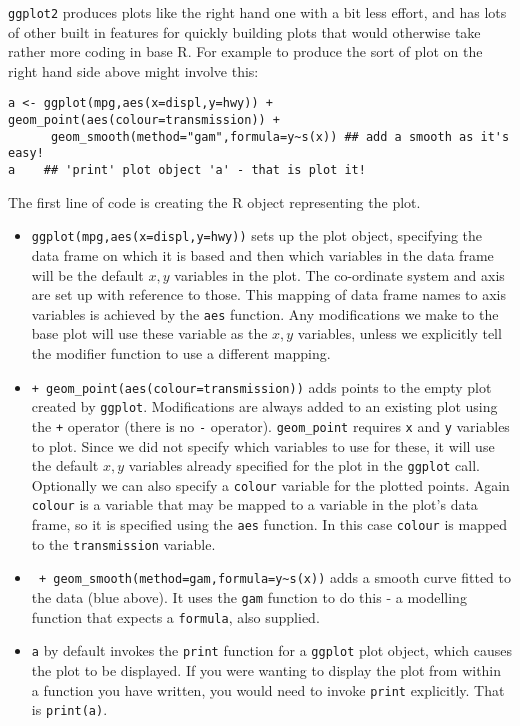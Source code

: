 \documentclass[10pt] {article}
\newcommand{\eps}[3]
{{\begin{center}
 \rotatebox{#1}{\scalebox{#2}{\texttt{[image: \#3]}}}
 \end{center}}
}
\theoremstyle{definition}
\begin{document}
{\tt ggplot2} produces plots like the right hand one with a bit less effort, and has lots of other built in features for quickly building plots that would otherwise take rather more coding in base R. For example to produce the sort of plot on the right hand side above might involve this:
\begin{lstlisting}
a <- ggplot(mpg,aes(x=displ,y=hwy)) + geom_point(aes(colour=transmission)) +
      geom_smooth(method="gam",formula=y~s(x)) ## add a smooth as it's easy!
a    ## 'print' plot object 'a' - that is plot it!
\end{lstlisting}
\eps{0}{.7}{mpg-gg.pdf}
The first line of code is creating the R object representing the plot. 
\begin{itemize}
\item \lstinline+ggplot(mpg,aes(x=displ,y=hwy))+ sets up the plot object, specifying the data frame on which it is based and then which variables in the data frame will be the default $x,y$ variables in the plot. The co-ordinate system and axis are set up with reference to those. This mapping of data frame names to axis variables is achieved by the {\tt aes} function. Any modifications we make to the base plot will use these variable as the $x, y$ variables, unless we explicitly tell the modifier function to use a different mapping.
\item \lstinline^+ geom_point(aes(colour=transmission))^ adds points to the empty plot created by {\tt ggplot}. Modifications are always added to an existing plot using the \verb^+^ operator (there is no \verb^-^ operator). \lstinline+geom_point+ requires {\tt x} and {\tt y} variables to plot. Since we did not specify which variables to use for these, it will use the default $x,y$ variables already specified for the plot in the {\tt ggplot} call. Optionally we can also specify a {\tt colour} variable for the plotted points. Again {\tt colour} is a variable that may be mapped to a variable in the plot's data frame, so it is specified using the {\tt aes} function. In this case {\tt colour} is mapped to the {\tt transmission} variable. 
\item \lstinline^ + geom_smooth(method=gam,formula=y~s(x))^ adds a smooth curve fitted to the data (blue above). It uses the \lstinline+gam+ function to do this - a modelling function that expects a \lstinline+formula+, also supplied.
\item \lstinline+a+ by default invokes the {\tt print} function for a {\tt ggplot} plot object, which causes the plot to be displayed. If you were wanting to display the plot from within a function you have written, you would need to invoke {\tt print} explicitly. That is \lstinline+print(a)+.    
\end{itemize} 
\end{document}
